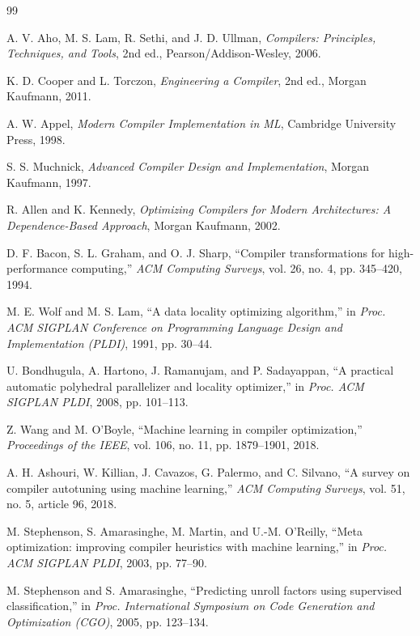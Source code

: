 \documentclass[12pt,a4paper]{article}
\begin{document}
\begin{thebibliography}{99}

A. V. Aho, M. S. Lam, R. Sethi, and J. D. Ullman,
\textit{Compilers: Principles, Techniques, and Tools},
2nd ed., Pearson/Addison-Wesley, 2006.

K. D. Cooper and L. Torczon,
\textit{Engineering a Compiler},
2nd ed., Morgan Kaufmann, 2011.

A. W. Appel,
\textit{Modern Compiler Implementation in ML},
Cambridge University Press, 1998.

S. S. Muchnick,
\textit{Advanced Compiler Design and Implementation},
Morgan Kaufmann, 1997.

R. Allen and K. Kennedy,
\textit{Optimizing Compilers for Modern Architectures: A Dependence-Based Approach},
Morgan Kaufmann, 2002.

D. F. Bacon, S. L. Graham, and O. J. Sharp,
``Compiler transformations for high-performance computing,''
\textit{ACM Computing Surveys}, vol. 26, no. 4, pp. 345--420, 1994.

M. E. Wolf and M. S. Lam,
``A data locality optimizing algorithm,''
in \textit{Proc. ACM SIGPLAN Conference on Programming Language Design and
Implementation (PLDI)}, 1991, pp. 30--44.

U. Bondhugula, A. Hartono, J. Ramanujam, and P. Sadayappan,
``A practical automatic polyhedral parallelizer and locality optimizer,''
in \textit{Proc. ACM SIGPLAN PLDI}, 2008, pp. 101--113.

Z. Wang and M. O'Boyle,
``Machine learning in compiler optimization,''
\textit{Proceedings of the IEEE}, vol. 106, no. 11, pp. 1879--1901, 2018.

A. H. Ashouri, W. Killian, J. Cavazos, G. Palermo, and C. Silvano,
``A survey on compiler autotuning using machine learning,''
\textit{ACM Computing Surveys}, vol. 51, no. 5, article 96, 2018.

M. Stephenson, S. Amarasinghe, M. Martin, and U.-M. O'Reilly,
``Meta optimization: improving compiler heuristics with machine learning,''
in \textit{Proc. ACM SIGPLAN PLDI}, 2003, pp. 77--90.

M. Stephenson and S. Amarasinghe,
``Predicting unroll factors using supervised classification,''
in \textit{Proc. International Symposium on Code Generation and Optimization (CGO)},
2005, pp. 123--134.


\end{thebibliography}
\end{document}
